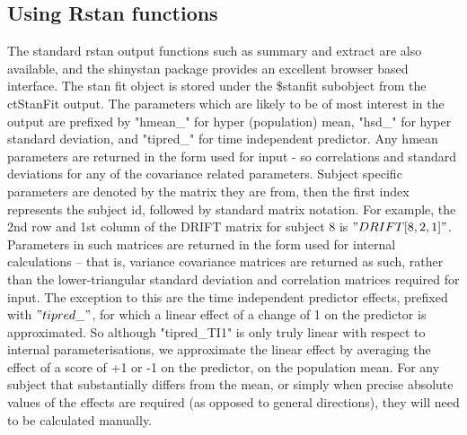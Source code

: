\documentclass[nojss]{jss}\usepackage[]{graphicx}\usepackage[]{color}
\begin{document}
{\subsection{Using Rstan functions}
The standard rstan output functions such as summary and extract are also available, and the shinystan package provides an excellent browser based interface. The stan fit object is stored under the \$stanfit subobject from the ctStanFit output. The parameters which are likely to be of most interest in the output are prefixed by "hmean\_" for hyper (population) mean, "hsd\_" for hyper standard deviation, and "tipred\_" for time independent predictor. Any hmean parameters are returned in the form used for input - so correlations and standard deviations for any of the covariance related parameters. Subject specific parameters are denoted by the matrix they are from, then the first index represents the subject id, followed by standard matrix notation. For example, the 2nd row and 1st column of the DRIFT matrix for subject 8 is $"DRIFT[8,2,1]"$. Parameters in such matrices are returned in the form used for internal calculations -- that is, variance covariance matrices are returned as such, rather than the lower-triangular standard deviation and correlation matrices required for input. The exception to this are the time independent predictor effects, prefixed with $"tipred\_"$, for which a linear effect of a change of 1 on the predictor is approximated. So although "tipred\_TI1" is only truly linear with respect to internal parameterisations, we approximate the linear effect by averaging the effect of a score of +1 or -1 on the predictor, on the population mean. For any subject that substantially differs from the mean, or simply when precise absolute values of the effects are required (as opposed to general directions), they will need to be calculated manually.


}
\end{document}
